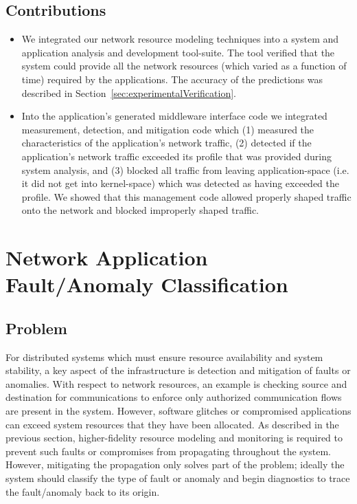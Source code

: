 \subsection{Contributions}
\begin{itemize}
	\item We integrated our network resource modeling techniques
          into a system and application analysis and development
          tool-suite. The tool verified that the system could provide
          all the network resources (which varied as a function of
          time) required by the applications.  The accuracy of the
          predictions was described in
          Section~\ref{sec:experimentalVerification}.
	\item Into the application's generated middleware interface
          code we integrated measurement, detection, and mitigation
          code which (1) measured the characteristics of the
          application's network traffic, (2) detected if the
          application's network traffic exceeded its profile that was
          provided during system analysis, and (3) blocked all traffic
          from leaving application-space (i.e. it did not get into
          kernel-space) which was detected as having exceeded the
          profile.  We showed that this management code allowed
          properly shaped traffic onto the network and blocked
          improperly shaped traffic.
\end{itemize}

\section{Network Application Fault/Anomaly Classification}
\label{sec:classification}

\subsection{Problem}
For distributed systems which must ensure resource availability and
system stability, a key aspect of the infrastructure is detection and
mitigation of faults or anomalies.  With respect to network resources,
an example is checking source and destination for communications to
enforce only authorized communication flows are present in the system.
However, software glitches or compromised applications can exceed
system resources that they have been allocated.  As described in the
previous section, higher-fidelity resource modeling and monitoring is
required to prevent such faults or compromises from propagating
throughout the system.  However, mitigating the propagation only
solves part of the problem; ideally the system should classify the
type of fault or anomaly and begin diagnostics to trace the
fault/anomaly back to its origin.

